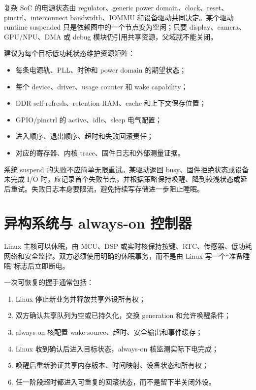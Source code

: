 复杂 SoC 的电源状态由 regulator、generic power domain、clock、reset、pinctrl、interconnect bandwidth、IOMMU 和设备驱动共同决定。某个驱动 runtime suspended 只是依赖图中的一个节点变为空闲；只要 display、camera、GPU/NPU、DMA 或 debug 模块仍引用共享资源，父域就不能关闭。

建议为每个目标低功耗状态维护资源矩阵：

\begin{itemize}
  \item 每条电源轨、PLL、时钟和 power domain 的期望状态；
  \item 每个 device、driver、usage counter 和 wake capability；
  \item DDR self-refresh、retention RAM、cache 和上下文保存位置；
  \item GPIO/pinctrl 的 active、idle、sleep 电气配置；
  \item 进入顺序、退出顺序、超时和失败回滚责任；
  \item 对应的寄存器、内核 trace、固件日志和外部测量证据。
\end{itemize}

系统 suspend 的失败不应简单无限重试。某驱动返回 busy、固件拒绝状态或设备未完成 I/O 时，应记录首个失败节点，并根据策略保持唤醒、降到较浅状态或延后重试。失败日志本身要限流，避免持续写存储进一步阻止睡眠。

\section{异构系统与 always-on 控制器}

Linux 主核可以休眠，由 MCU、DSP 或实时核保持按键、RTC、传感器、低功耗网络和安全监控。双方必须使用明确的休眠事务，而不是由 Linux 写一个“准备睡眠”标志后立即断电。

一次可恢复的握手通常包括：

\begin{enumerate}
  \item Linux 停止新业务并释放共享外设所有权；
  \item 双方确认共享队列为空或已持久化，交换 generation 和允许唤醒条件；
  \item always-on 核配置 wake source、超时、安全输出和事件缓存；
  \item Linux 收到确认后进入目标状态，always-on 核监测实际下电完成；
  \item 唤醒后重新验证共享内存版本、时间映射、设备状态和所有权；
  \item 任一阶段超时都进入可重复的回滚状态，而不是留下半关闭外设。
\end{enumerate}

